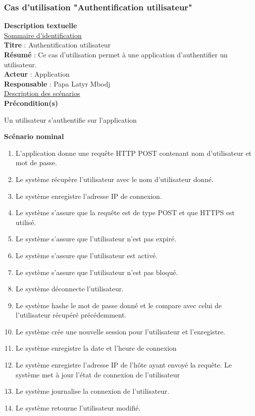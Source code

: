 \subsubsection{Cas d'utilisation "Authentification utilisateur"}
\textbf{\RIGHTarrow Description textuelle}\\
\underline{\underline{Sommaire d’identification}} \\
\textbf{Titre} : Authentification utilisateur\\
\textbf{Résumé} : Ce cas d’utilisation permet à une application d'authentifier un utilisateur.\\
\textbf{Acteur} : Application\\	
\textbf{Responsable} : Papa Latyr Mbodj\\
\underline{\underline{Description des scénarios}}\\
\textbf{Précondition(s)}
\begin{itemize}
	\itemtirait Un utilisateur s'authentifie sur l'application
\end{itemize}
\textbf{Scénario nominal}
\begin{enumerate}
	\item L'application donne une requête HTTP POST contenant nom d'utilisateur et mot de passe.
	\item Le système récupère l'utilisateur avec le nom d'utilisateur donné.
	\item Le système enregistre l'adresse IP de connexion.
	\item Le système s'assure que la requête est de type POST et que HTTPS est utilisé.
	\item Le système s'assure que l'utilisateur n'est pas expiré.
	\item Le système s'assure que l'utilisateur est activé.
	\item Le système s'assure que l'utilisateur n'est pas bloqué.
	\item Le système déconnecte l'utilisateur.
	\item Le système hashe le mot de passe donné et le compare avec celui de l'utilisateur récupéré précédemment.
	\item Le système crée une nouvelle session pour l'utilisateur et l'enregistre.
	\item Le système enregistre la date et l'heure de connexion 
	\item Le système enregistre l'adresse IP de l'hôte ayant envoyé la requête.
	Le système met à jour l'état de connexion de l'utilisateur
	\item Le système journalise la connexion de l'utilisateur.
	\item Le système retourne l'utilisateur modifié.
\end{enumerate}
